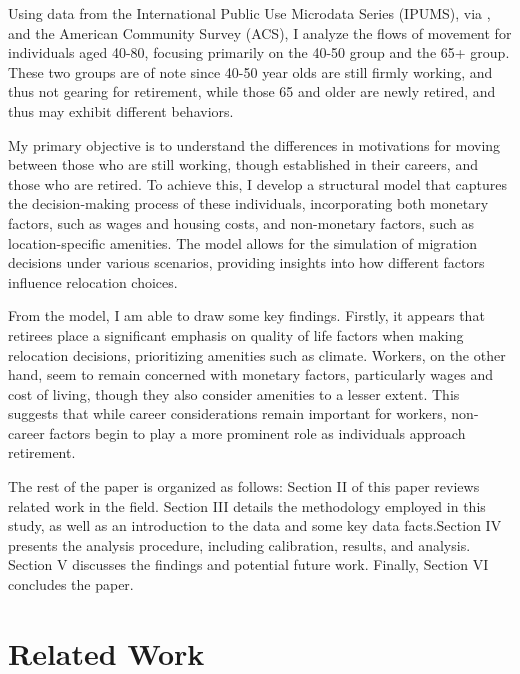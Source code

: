 \documentclass[11pt,a4paper]{article}
\begin{document}
Using data from the International Public Use Microdata Series (IPUMS), via \cite{ruggles_ipums_2025}, and the American Community Survey (ACS), I analyze the flows of movement for individuals aged 40-80, focusing primarily on the 40-50 group and the 65+ group. These two groups are of note since 40-50 year olds are still firmly working, and thus not gearing for retirement, while those 65 and older are newly retired, and thus may exhibit different behaviors. 

My primary objective is to understand the differences in motivations for moving between those who are still working, though established in their careers, and those who are retired. To achieve this, I develop a structural model that captures the decision-making process of these individuals, incorporating both monetary factors, such as wages and housing costs, and non-monetary factors, such as location-specific amenities. The model allows for the simulation of migration decisions under various scenarios, providing insights into how different factors influence relocation choices.

From the model, I am able to draw some key findings. Firstly, it appears that retirees place a significant emphasis on quality of life factors when making relocation decisions, prioritizing amenities such as climate. Workers, on the other hand, seem to remain concerned with monetary factors, particularly wages and cost of living, though they also consider amenities to a lesser extent. This suggests that while career considerations remain important for workers, non-career factors begin to play a more prominent role as individuals approach retirement.

The rest of the paper is organized as follows: Section II of this paper reviews related work in the field. Section III details the methodology employed in this study, as well as an introduction to the data and some key data facts.Section IV presents the analysis procedure, including calibration, results, and analysis. Section V discusses the findings and potential future work. Finally, Section VI concludes the paper.

\section{Related Work}
\label{sec:related_work}
\end{document}

